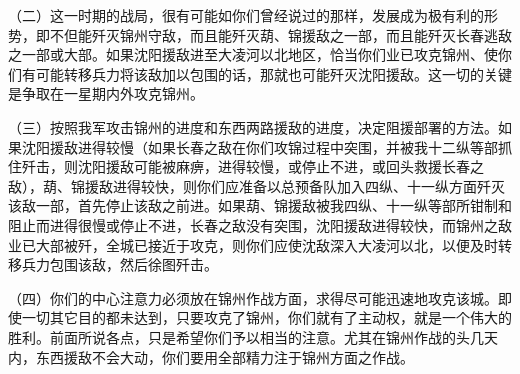 （二）这一时期的战局，很有可能如你们曾经说过的那样，发展成为极有利的形势，即不但能歼灭锦州守敌，而且能歼灭葫、锦援敌之一部，而且能歼灭长春逃敌之一部或大部。如果沈阳援敌进至大凌河以北地区，恰当你们业已攻克锦州、使你们有可能转移兵力将该敌加以包围的话，那就也可能歼灭沈阳援敌。这一切的关键是争取在一星期内外攻克锦州。

（三）按照我军攻击锦州的进度和东西两路援敌的进度，决定阻援部署的方法。如果沈阳援敌进得较慢（如果长春之敌在你们攻锦过程中突围，并被我十二纵等部抓住歼击，则沈阳援敌可能被麻痹，进得较慢，或停止不进，或回头救援长春之敌），葫、锦援敌进得较快，则你们应准备以总预备队加入四纵、十一纵方面歼灭该敌一部，首先停止该敌之前进。如果葫、锦援敌被我四纵、十一纵等部所钳制和阻止而进得很慢或停止不进，长春之敌没有突围，沈阳援敌进得较快，而锦州之敌业已大部被歼，全城已接近于攻克，则你们应使沈敌深入大凌河以北，以便及时转移兵力包围该敌，然后徐图歼击。

（四）你们的中心注意力必须放在锦州作战方面，求得尽可能迅速地攻克该城。即使一切其它目的都未达到，只要攻克了锦州，你们就有了主动权，就是一个伟大的胜利。前面所说各点，只是希望你们予以相当的注意。尤其在锦州作战的头几天内，东西援敌不会大动，你们要用全部精力注于锦州方面之作战。


